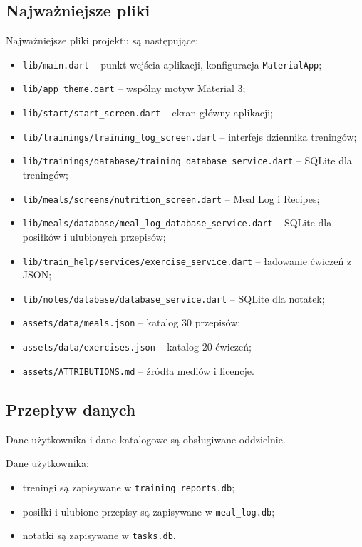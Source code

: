 \documentclass[12pt,a4paper]{article}
\begin{document}
\subsection{Najważniejsze pliki}

Najważniejsze pliki projektu są następujące:

\begin{itemize}
    \item \texttt{lib/main.dart} -- punkt wejścia aplikacji, konfiguracja \texttt{MaterialApp};
    \item \texttt{lib/app\_theme.dart} -- wspólny motyw Material 3;
    \item \texttt{lib/start/start\_screen.dart} -- ekran główny aplikacji;
    \item \texttt{lib/trainings/training\_log\_screen.dart} -- interfejs dziennika treningów;
    \item \texttt{lib/trainings/database/training\_database\_service.dart} -- SQLite dla treningów;
    \item \texttt{lib/meals/screens/nutrition\_screen.dart} -- Meal Log i Recipes;
    \item \texttt{lib/meals/database/meal\_log\_database\_service.dart} -- SQLite dla posiłków i ulubionych przepisów;
    \item \texttt{lib/train\_help/services/exercise\_service.dart} -- ładowanie ćwiczeń z JSON;
    \item \texttt{lib/notes/database/database\_service.dart} -- SQLite dla notatek;
    \item \texttt{assets/data/meals.json} -- katalog 30 przepisów;
    \item \texttt{assets/data/exercises.json} -- katalog 20 ćwiczeń;
    \item \texttt{assets/ATTRIBUTIONS.md} -- źródła mediów i licencje.
\end{itemize}

\subsection{Przepływ danych}

Dane użytkownika i dane katalogowe są obsługiwane oddzielnie.

Dane użytkownika:

\begin{itemize}
    \item treningi są zapisywane w \texttt{training\_reports.db};
    \item posiłki i ulubione przepisy są zapisywane w \texttt{meal\_log.db};
    \item notatki są zapisywane w \texttt{tasks.db}.
\end{itemize}
\end{document}
